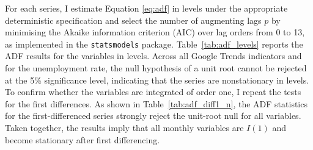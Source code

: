 \documentclass[12pt,a4paper]{article}
\begin{document}
For each series, I estimate Equation \eqref{eq:adf} in levels under the appropriate deterministic specification and select the number of augmenting lags $p$ by minimising the Akaike information criterion (AIC) over lag orders from 0 to 13, as implemented in the \texttt{statsmodels} package.
Table~\ref{tab:adf_levels} reports the ADF results for the variables in levels. Across all Google Trends indicators and for the unemployment rate, the null hypothesis of a unit root cannot be rejected at the 5\% significance level, indicating that the series are nonstationary in levels. To confirm whether the variables are integrated of order one, I repeat the tests for the first differences. As shown in Table~\ref{tab:adf_diff1_n}, the ADF statistics for the first-differenced series strongly reject the unit-root null for all variables. Taken together, the results imply that all monthly variables are $I(1)$ and become stationary after first differencing.
\end{document}
